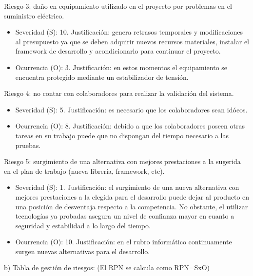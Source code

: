 \documentclass[
11pt, %
]{charter}
\begin{document}
Riesgo 3: daño en equipamiento utilizado en el proyecto por problemas en el suministro eléctrico.
\begin{itemize}
	\item Severidad (S): 10.\newline 
	Justificación: genera retrasos temporales y modificaciones al presupuesto ya que se deben adquirir nuevos recursos materiales, instalar el framework de desarrollo y acondicionarlo para continuar el proyecto.
	\item Ocurrencia (O): 3.\newline 
	Justificación: en estos momentos el equipamiento se encuentra protegido mediante un estabilizador de tensión.
\end{itemize}	
Riesgo 4: no contar con colaboradores para realizar la validación del sistema.
\begin{itemize}
	\item Severidad (S): 5.\newline 
	Justificación: es necesario que los colaboradores sean idóeos.
	\item Ocurrencia (O): 8.\newline 
	Justificación: debido a que los colaboradores poseen otras tareas en su trabajo puede que no dispongan del tiempo necesario a las pruebas.
\end{itemize}
Riesgo 5: surgimiento de una alternativa con mejores prestaciones a la sugerida en el plan de trabajo (nueva librería, framework, etc).
\begin{itemize}
	\item Severidad (S): 1.\newline 
	Justificación: el surgimiento de una nueva alternativa con mejores prestaciones a la elegida para el desarrollo puede dejar al producto en una posición de desventaja respecto a la competencia. No obstante, el utilizar tecnologías ya probadas asegura un nivel de confianza mayor en cuanto a seguridad y estabilidad a lo largo del tiempo.
	\item Ocurrencia (O): 10.\newline 
	Justificación: en el rubro informático continuamente surgen nuevas alternativas para el desarrollo. 	
		 
	
\end{itemize}


b) Tabla de gestión de riesgos:      (El RPN se calcula como RPN=SxO)
\end{document}
